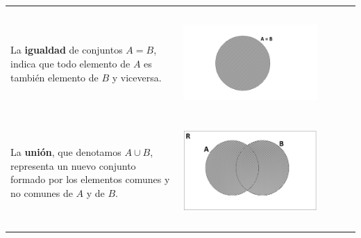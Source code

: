 \documentclass[12pt]{article}
\theoremstyle{definition}
\begin{document}
\begin{enumerate}
\begin{table}[ H]
\begin{center}
\begin{tabular} { l l }
\begin{minipage}{5cm}
\begin{center}
\end{center}
\end{minipage}\\ \\   
\begin{minipage}{10cm} La \textbf{igualdad} de conjuntos $A = B$, indica que todo elemento de $A$ es también elemento de $B$ y viceversa.\end{minipage}& \begin{minipage}{5cm} \begin{center} 
\includegraphics[width=0.8\textwidth]{tp1_fig9.jpg} 
\end{center}
\end{minipage}\\ \\ 
 \begin{minipage}{10cm} La \textbf{unión}, que denotamos $A \cup B$, representa un nuevo conjunto formado por los elementos comunes y no comunes de $A$ y de $B$. \end{minipage} &\begin{minipage}{5cm} \begin{center} 
\includegraphics[width=0.8\textwidth]{tp1_fig5.jpg} 
\end{center}
\end{minipage}\\ \\  

\end{tabular}
\end{center}
\end{table}
\end{enumerate}
\end{document}
